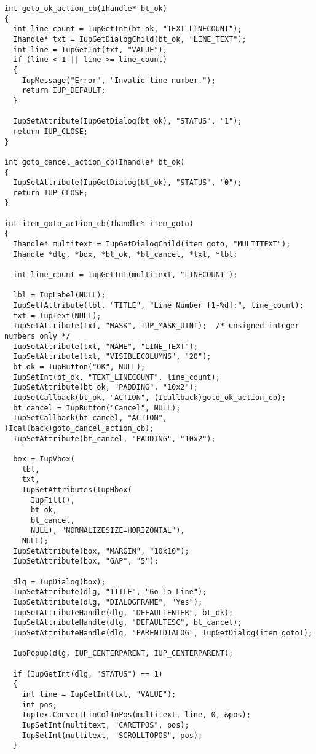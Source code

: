 \documentclass{ctexart}
\begin{document}
\begin{lstlisting}
int goto_ok_action_cb(Ihandle* bt_ok)
{
  int line_count = IupGetInt(bt_ok, "TEXT_LINECOUNT");
  Ihandle* txt = IupGetDialogChild(bt_ok, "LINE_TEXT");
  int line = IupGetInt(txt, "VALUE");
  if (line < 1 || line >= line_count)
  {
    IupMessage("Error", "Invalid line number.");
    return IUP_DEFAULT;
  }

  IupSetAttribute(IupGetDialog(bt_ok), "STATUS", "1");
  return IUP_CLOSE;
}

int goto_cancel_action_cb(Ihandle* bt_ok)
{
  IupSetAttribute(IupGetDialog(bt_ok), "STATUS", "0");
  return IUP_CLOSE;
}

int item_goto_action_cb(Ihandle* item_goto)
{
  Ihandle* multitext = IupGetDialogChild(item_goto, "MULTITEXT");
  Ihandle *dlg, *box, *bt_ok, *bt_cancel, *txt, *lbl;

  int line_count = IupGetInt(multitext, "LINECOUNT");

  lbl = IupLabel(NULL);
  IupSetfAttribute(lbl, "TITLE", "Line Number [1-%d]:", line_count);
  txt = IupText(NULL);
  IupSetAttribute(txt, "MASK", IUP_MASK_UINT);  /* unsigned integer numbers only */
  IupSetAttribute(txt, "NAME", "LINE_TEXT");
  IupSetAttribute(txt, "VISIBLECOLUMNS", "20");
  bt_ok = IupButton("OK", NULL);
  IupSetInt(bt_ok, "TEXT_LINECOUNT", line_count);
  IupSetAttribute(bt_ok, "PADDING", "10x2");
  IupSetCallback(bt_ok, "ACTION", (Icallback)goto_ok_action_cb);
  bt_cancel = IupButton("Cancel", NULL);
  IupSetCallback(bt_cancel, "ACTION", (Icallback)goto_cancel_action_cb);
  IupSetAttribute(bt_cancel, "PADDING", "10x2");

  box = IupVbox(
    lbl,
    txt,
    IupSetAttributes(IupHbox(
      IupFill(),
      bt_ok,
      bt_cancel,
      NULL), "NORMALIZESIZE=HORIZONTAL"),
    NULL);
  IupSetAttribute(box, "MARGIN", "10x10");
  IupSetAttribute(box, "GAP", "5");

  dlg = IupDialog(box);
  IupSetAttribute(dlg, "TITLE", "Go To Line");
  IupSetAttribute(dlg, "DIALOGFRAME", "Yes");
  IupSetAttributeHandle(dlg, "DEFAULTENTER", bt_ok);
  IupSetAttributeHandle(dlg, "DEFAULTESC", bt_cancel);
  IupSetAttributeHandle(dlg, "PARENTDIALOG", IupGetDialog(item_goto));

  IupPopup(dlg, IUP_CENTERPARENT, IUP_CENTERPARENT);

  if (IupGetInt(dlg, "STATUS") == 1)
  {
    int line = IupGetInt(txt, "VALUE");
    int pos;
    IupTextConvertLinColToPos(multitext, line, 0, &pos);
    IupSetInt(multitext, "CARETPOS", pos);
    IupSetInt(multitext, "SCROLLTOPOS", pos);
  }


\end{lstlisting}
\end{document}
